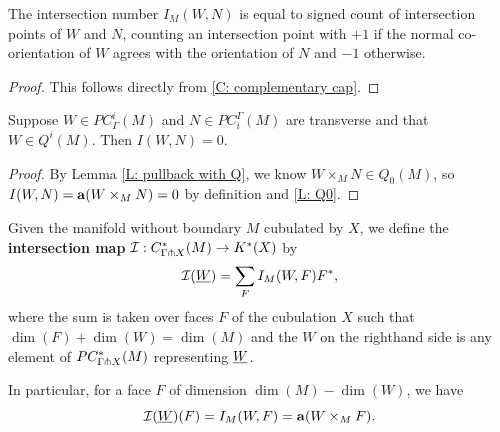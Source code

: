 \begin{lemma}\label{L: intersection number}
The intersection number $I_M(W,N)$ is equal to signed count of intersection points of $W$ and $N$, counting an intersection point with $+1$ if  the normal co-orientation of $W$ agrees with the orientation of $N$ and $-1$ otherwise.
\end{lemma}
\begin{proof}
This follows directly from \cref{C: complementary cap}.

\end{proof}

\begin{lemma}\label{L: Q-trivial intersection}
Suppose $W\in PC_\Gamma^i(M)$ and $N\in PC_{i}^\Gamma(M)$ are transverse and that $W\in Q^i(M)$. Then $I(W,N)=0$.
\end{lemma}
\begin{proof}
By Lemma \ref{L: pullback with Q}, we know $W\times_M N\in Q_0(M)$, so $I(W,N)=\mathbf{a}(W\times_MN)=0$ by definition and \cref{L: Q0}.
\end{proof}


\begin{definition}\label{D: intersection homomorphism}
Given the manifold without boundary $M$ cubulated by $X$, we define the \textbf{intersection map} $\mathcal{I}: C^*_{\Gamma\pitchfork X}(M)\to K^*(X)$ by $$\mathcal{I}(\underline{W})=\sum_F I_M(W,F)F^*,$$ where the sum is taken over faces $F$ of the cubulation $X$ such that $\dim(F)+\dim(W)=\dim(M)$ and the $W$ on the righthand side is any element of $PC^*_{\Gamma\pitchfork X}(M)$ representing $\underline{W}$.

In particular, for a face $F$ of dimension $\dim(M)-\dim(W)$, we have $$\mathcal{I}(\underline{W})(F)=I_M(W,F)=\mathbf{a}(W\times_MF).$$
\end{definition}



